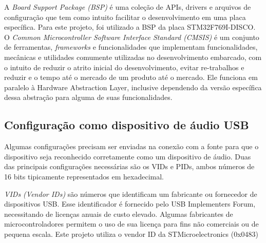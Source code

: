 A \textit{Board Support Package (BSP)} é uma coleção de APIs, drivers e arquivos de configuração que tem como intuito facilitar o desenvolvimento em uma placa específica. 
Para este projeto, foi utilizado a BSP da placa STM32F769I-DISCO.
\\[10pt]

O \textit{Common Microcontroller Software Interface Standard (CMSIS)} é um conjunto de ferramentas, \textit{frameworks} e funcionalidades que implementam funcionalidades, mecânicas e utilidades comumente utilizadas no desenvolvimento embarcado, com o intuito de reduzir o atrito inicial do desenvolvimento, evitar re-trabalhos e reduzir e o tempo até o mercado de um produto até o mercado. Ele funciona em paralelo à Hardware Abstraction Layer, inclusive dependendo da versão específica dessa abstração para alguma de suas funcionalidades.





\subsection{Configuração como dispositivo de áudio USB}
Algumas configurações precisam ser enviadas na conexão com a fonte para que o dispositivo seja reconhecido corretamente como um dispositivo de áudio. Duas das principais configurações necessárias são os VIDs e PIDs, ambos números de 16 bits tipicamente representados em hexadecimal.


\textit{VIDs (Vendor IDs)} são números que identificam um fabricante ou fornecedor de dispositivos USB. Esse identificador é fornecido pelo USB Implementers Forum, necessitando de licenças anuais de custo elevado. Algumas fabricantes de microcontroladores permitem o uso de sua licença para fins não comerciais ou de pequena escala. Este projeto utiliza o vendor ID da STMicroelectronics (0x0483)

